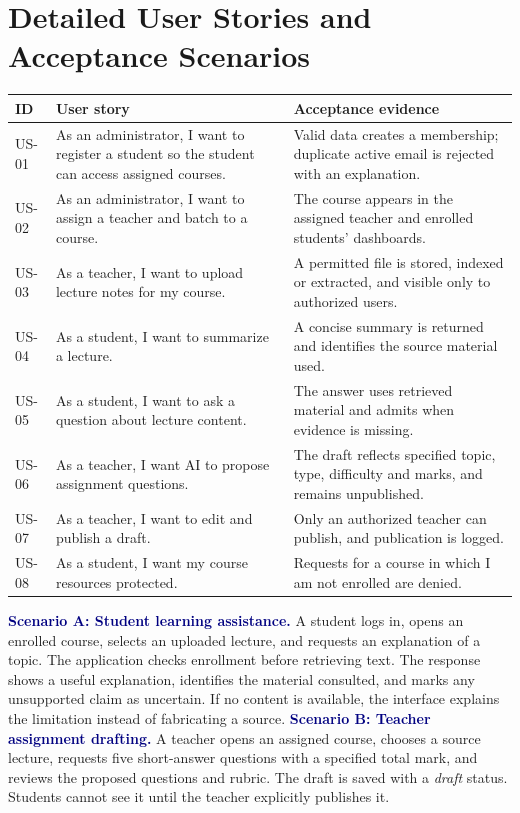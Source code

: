 \documentclass[11pt,a4paper]{article}
\newcommand{\heading}[1]{\vspace{5pt}\textcolor{navy}{\textbf{#1}}}
\begin{document}
\section{Detailed User Stories and Acceptance Scenarios}
\begin{longtable}{p{}p{}p{}}
\toprule ID & User story & Acceptance evidence \\\midrule\endhead
US-01 & As an administrator, I want to register a student so the student can access assigned courses. & Valid data creates a membership; duplicate active email is rejected with an explanation.\\
US-02 & As an administrator, I want to assign a teacher and batch to a course. & The course appears in the assigned teacher and enrolled students' dashboards.\\
US-03 & As a teacher, I want to upload lecture notes for my course. & A permitted file is stored, indexed or extracted, and visible only to authorized users.\\
US-04 & As a student, I want to summarize a lecture. & A concise summary is returned and identifies the source material used.\\
US-05 & As a student, I want to ask a question about lecture content. & The answer uses retrieved material and admits when evidence is missing.\\
US-06 & As a teacher, I want AI to propose assignment questions. & The draft reflects specified topic, type, difficulty and marks, and remains unpublished.\\
US-07 & As a teacher, I want to edit and publish a draft. & Only an authorized teacher can publish, and publication is logged.\\
US-08 & As a student, I want my course resources protected. & Requests for a course in which I am not enrolled are denied.\\
\bottomrule
\end{longtable}
\heading{Scenario A: Student learning assistance.} A student logs in, opens an enrolled course, selects an uploaded lecture, and requests an explanation of a topic. The application checks enrollment before retrieving text. The response shows a useful explanation, identifies the material consulted, and marks any unsupported claim as uncertain. If no content is available, the interface explains the limitation instead of fabricating a source.
\heading{Scenario B: Teacher assignment drafting.} A teacher opens an assigned course, chooses a source lecture, requests five short-answer questions with a specified total mark, and reviews the proposed questions and rubric. The draft is saved with a \emph{draft} status. Students cannot see it until the teacher explicitly publishes it.
\end{document}
